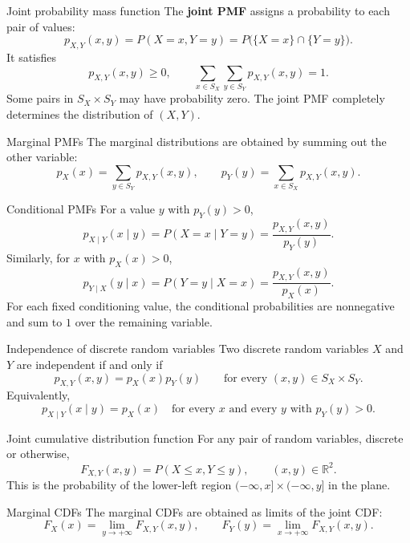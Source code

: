 \documentclass[12pt,a4paper,oneside]{report}
\begin{document}
\begingroup
\renewcommand{\thefootnote}{\fnsymbol{footnote}}
\endgroup
\nopagebreak
\begin{frameddefn}{Joint probability mass function}
The \textbf{joint PMF} assigns a probability to each pair of values\begingroup\renewcommand{\thefootnote}{\fnsymbol{footnote}}\footnotemark[5]\endgroup:
\[
  p_{X,Y}(x,y)=P(X=x,Y=y)
    =P\bigl(\{X=x\}\cap\{Y=y\}\bigr).
\]
It satisfies
\[
  p_{X,Y}(x,y)\geq0,
  \qquad
  \sum_{x\in S_X}\sum_{y\in S_Y}p_{X,Y}(x,y)=1.
\]
Some pairs in $S_X\times S_Y$ may have probability zero.
The joint PMF completely determines the distribution of $(X,Y)$.
\end{frameddefn}

\begin{framedprop}{Marginal PMFs}
The marginal distributions are obtained by summing out the
other variable:
\[
  p_X(x)=\sum_{y\in S_Y}p_{X,Y}(x,y),
  \qquad
  p_Y(y)=\sum_{x\in S_X}p_{X,Y}(x,y).
\]
\end{framedprop}

\begin{frameddefn}{Conditional PMFs}
For a value $y$ with $p_Y(y)>0$,
\[
  p_{X\mid Y}(x\mid y)
    =P(X=x\mid Y=y)
    =\frac{p_{X,Y}(x,y)}{p_Y(y)}.
\]
Similarly, for $x$ with $p_X(x)>0$,
\[
  p_{Y\mid X}(y\mid x)
    =P(Y=y\mid X=x)
    =\frac{p_{X,Y}(x,y)}{p_X(x)}.
\]
For each fixed conditioning value, the conditional probabilities
are nonnegative and sum to $1$ over the remaining variable.
\end{frameddefn}

\begin{frameddefn}{Independence of discrete random variables}
Two discrete random variables $X$ and $Y$ are independent if
and only if
\[
  p_{X,Y}(x,y)=p_X(x)p_Y(y)
  \qquad\text{for every }(x,y)\in S_X\times S_Y.
\]
Equivalently,
\[
  p_{X\mid Y}(x\mid y)=p_X(x)
  \quad\text{for every }x
  \text{ and every }y\text{ with }p_Y(y)>0.
\]
\end{frameddefn}

\begin{frameddefn}{Joint cumulative distribution function}
For any pair of random variables, discrete or otherwise,
\[
  F_{X,Y}(x,y)=P(X\leq x,Y\leq y),
  \qquad (x,y)\in\mathbb R^2.
\]
This is the probability of the lower-left region
$(-\infty,x]\times(-\infty,y]$ in the plane.
\end{frameddefn}

\begin{framedprop}{Marginal CDFs}
\label{prop:marginal-cdfs}
The marginal CDFs are obtained as limits of the joint CDF:
\[
  F_X(x)=\lim_{y\to+\infty}F_{X,Y}(x,y),
  \qquad
  F_Y(y)=\lim_{x\to+\infty}F_{X,Y}(x,y).
\]
\end{framedprop}
\end{document}
